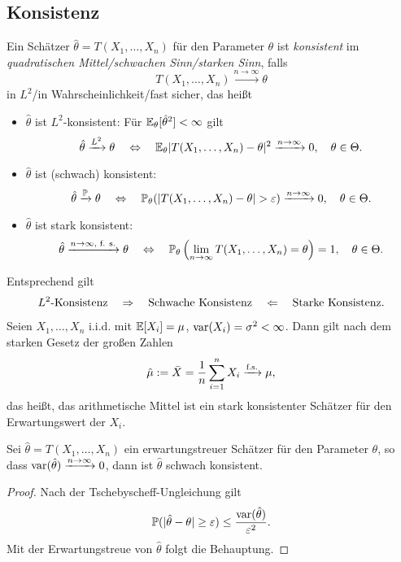 \subsection{Konsistenz}
\begin{defn}
  Ein Schätzer $\hat{\theta} = T(X_1, \ldots, X_n)$ für den Parameter $\theta$
  ist \emph{konsistent} im \emph{quadratischen Mittel/schwachen Sinn/starken
    Sinn},  falls
  \[ T(X_1, \ldots, X_n) \xrightarrow{n \to \infty} \theta \]
  in $L^2$/in Wahrscheinlichkeit/fast sicher, das heißt
  \begin{itemize}
  \item $\hat{\theta}$ ist $L^2$-konsistent: Für $\mathbb{E}_\theta[\hat{\theta}^2] <
    \infty$ gilt
    \[ \hat{\theta} \xrightarrow{L^2} \theta \quad \Leftrightarrow \quad \mathbb{E}_\theta|T(X_1, \ldots,
      X_n) - \theta|^2 \xrightarrow{n \to \infty} 0, \quad \theta \in \Theta. \]
  \item $\hat{\theta}$ ist (schwach) konsistent:
    \[ \hat{\theta} \xrightarrow{\mathbb{P}} \theta \quad \Leftrightarrow \quad \mathbb{P}_\theta( |T(X_1, \ldots,
      X_n ) - \theta | > \varepsilon ) \xrightarrow{n \to \infty} 0, \quad \theta \in
      \Theta. \]
  \item $\hat{\theta}$ ist stark konsistent:
    \[ \hat{\theta} \xrightarrow{n \to \infty, \text{ f. s.}} \theta \quad \Leftrightarrow \quad
      \mathbb{P}_\theta \left( \lim_{n \to \infty} T(X_1, \ldots,
      X_n ) = \theta \right) = 1, \quad \theta \in
      \Theta. \]
  \end{itemize}
  Entsprechend gilt
  \[ L^2\text{-Konsistenz} \quad \Rightarrow \quad \text{Schwache Konsistenz} \quad \Leftarrow \quad
    \text{Starke Konsistenz}. \]
\end{defn}

\begin{exmp}
  Seien $X_1, \ldots, X_n$ i.i.d. mit $\mathbb{E}[X_i] = \mu$, $\operatorname{var}(X_i) = \sigma^2 <
  \infty$. Dann gilt nach dem starken Gesetz der großen Zahlen
  \[ \hat{\mu} := \bar{X} = \frac{1}{n} \sum_{i=1}^n X_i \xrightarrow{\text{f.s.}}
    \mu, \]
  das heißt, das arithmetische Mittel ist ein stark konsistenter Schätzer für
  den Erwartungswert der $X_i$.
\end{exmp}

\begin{lem}
  Sei $\hat{\theta} = T(X_1, \ldots, X_n)$ ein erwartungstreuer Schätzer für den
  Parameter $\theta$, so dass $\operatorname{var}( \hat{\theta} ) \xrightarrow{n \to \infty}
  0$,  dann ist $\hat{\theta}$ schwach konsistent.
\end{lem}

\begin{proof}
  Nach der Tschebyscheff-Ungleichung gilt
  \[ \mathbb{P}(|\hat{\theta} - \theta| \ge \varepsilon) \le
    \frac{\operatorname{var}(\hat{\theta})}{\varepsilon^2}. \]
  Mit der Erwartungstreue von $\hat{\theta}$ folgt die Behauptung.
\end{proof}

